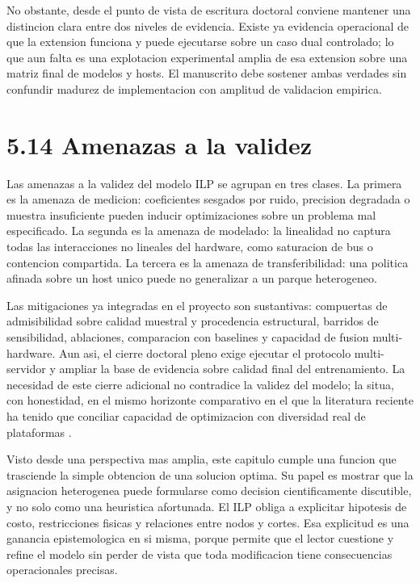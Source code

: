 No obstante, desde el punto de vista de escritura doctoral conviene mantener una distincion clara entre dos niveles de evidencia. Existe ya evidencia operacional de que la extension funciona y puede ejecutarse sobre un caso dual controlado; lo que aun falta es una explotacion experimental amplia de esa extension sobre una matriz final de modelos y hosts. El manuscrito debe sostener ambas verdades sin confundir madurez de implementacion con amplitud de validacion empirica.

\section{5.14 Amenazas a la validez}
Las amenazas a la validez del modelo ILP se agrupan en tres clases. La primera es la amenaza de medicion: coeficientes sesgados por ruido, precision degradada o muestra insuficiente pueden inducir optimizaciones sobre un problema mal especificado. La segunda es la amenaza de modelado: la linealidad no captura todas las interacciones no lineales del hardware, como saturacion de bus o contencion compartida. La tercera es la amenaza de transferibilidad: una politica afinada sobre un host unico puede no generalizar a un parque heterogeneo.

Las mitigaciones ya integradas en el proyecto son sustantivas: compuertas de admisibilidad sobre calidad muestral y procedencia estructural, barridos de sensibilidad, ablaciones, comparacion con baselines y capacidad de fusion multi-hardware. Aun asi, el cierre doctoral pleno exige ejecutar el protocolo multi-servidor y ampliar la base de evidencia sobre calidad final del entrenamiento. La necesidad de este cierre adicional no contradice la validez del modelo; la situa, con honestidad, en el mismo horizonte comparativo en el que la literatura reciente ha tenido que conciliar capacidad de optimizacion con diversidad real de plataformas \cite{rajbhandari2020zero,ren2021zerooffload,zheng2022alpa}.

Visto desde una perspectiva mas amplia, este capitulo cumple una funcion que trasciende la simple obtencion de una solucion optima. Su papel es mostrar que la asignacion heterogenea puede formularse como decision cientificamente discutible, y no solo como una heuristica afortunada. El ILP obliga a explicitar hipotesis de costo, restricciones fisicas y relaciones entre nodos y cortes. Esa explicitud es una ganancia epistemologica en si misma, porque permite que el lector cuestione y refine el modelo sin perder de vista que toda modificacion tiene consecuencias operacionales precisas.

